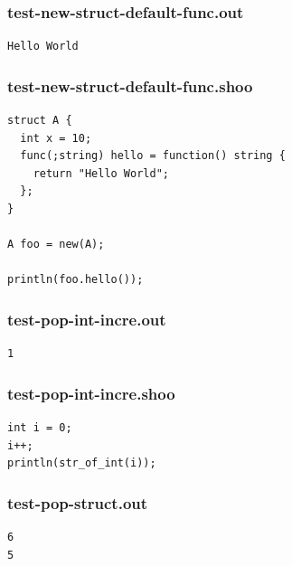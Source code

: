 \documentclass[12pt]{article}
\begin{document}
\subsubsection{test-new-struct-default-func.out}
\begin{mdframed}[hidealllines=true,backgroundcolor=green!10]
\begin{lstlisting}
Hello World
\end{lstlisting}
\end{mdframed}
\subsubsection{test-new-struct-default-func.shoo}
\begin{mdframed}[hidealllines=true,backgroundcolor=blue!10]
\begin{lstlisting}
struct A {
  int x = 10;
  func(;string) hello = function() string {
    return "Hello World";
  };
}

A foo = new(A);

println(foo.hello());
\end{lstlisting}
\end{mdframed}
\subsubsection{test-pop-int-incre.out}
\begin{mdframed}[hidealllines=true,backgroundcolor=green!10]
\begin{lstlisting}
1
\end{lstlisting}
\end{mdframed}
\subsubsection{test-pop-int-incre.shoo}
\begin{mdframed}[hidealllines=true,backgroundcolor=blue!10]
\begin{lstlisting}
int i = 0;
i++;
println(str_of_int(i));\end{lstlisting}
\end{mdframed}
\subsubsection{test-pop-struct.out}
\begin{mdframed}[hidealllines=true,backgroundcolor=green!10]
\begin{lstlisting}
6
5
\end{lstlisting}
\end{mdframed}
\end{document}
